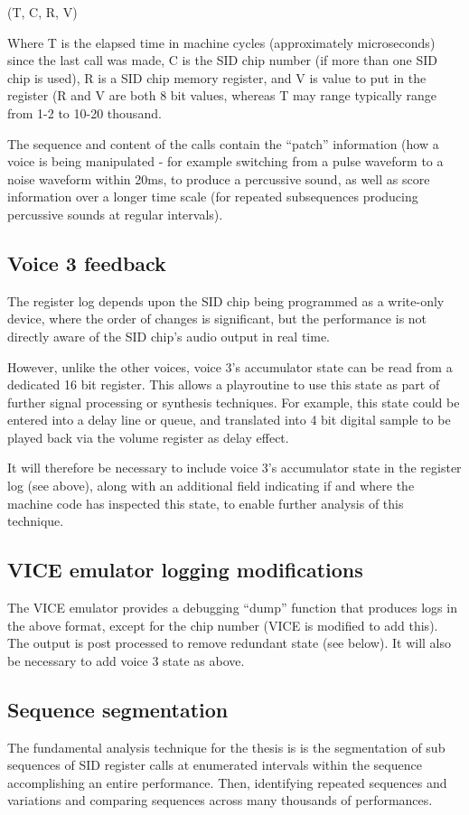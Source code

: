 \documentclass[10pt]{article}
\begin{document}
\begin{multicols*}{2}
  (T, C, R, V)

  Where T is the elapsed time in machine cycles (approximately
  microseconds) since the last call was made, C is the SID chip number
  (if more than one SID chip is used), R is a SID chip memory
  register, and V is value to put in the register (R and V are both 8
  bit values, whereas T may range typically range from 1-2 to 10-20
  thousand.

  The sequence and content of the calls contain the ``patch''
  information (how a voice is being manipulated - for example
  switching from a pulse waveform to a noise waveform within 20ms, to
  produce a percussive sound, as well as score information over a
  longer time scale (for repeated subsequences producing percussive
  sounds at regular intervals).

  \subsection{Voice 3 feedback}
  The register log depends upon the SID chip being programmed as a
  write-only device, where the order of changes is significant, but
  the performance is not directly aware of the SID chip's audio output
  in real time.

  However, unlike the other voices, voice 3's accumulator state can be
  read from a dedicated 16 bit register. This allows a playroutine to use
  this state as part of further signal processing or synthesis
  techniques. For example, this state could be entered into a delay
  line or queue, and translated into 4 bit digital sample to be played
  back via the volume register as delay effect.

  It will therefore be necessary to include voice 3's accumulator
  state in the register log (see above), along with an additional
  field indicating if and where the machine code has inspected this
  state, to enable further analysis of this technique.

  \subsection{VICE emulator logging modifications}
  The VICE emulator provides a debugging ``dump'' function that
  produces logs in the above format, except for the chip number
  (VICE is modified to add this).  The output is post processed
  to remove redundant state (see below).  It will also be
  necessary to add voice 3 state as above.

  \subsection{Sequence segmentation}
  The fundamental analysis technique for the thesis is
  is the segmentation of sub sequences of SID register calls at
  enumerated intervals within the sequence accomplishing an entire
  performance. Then, identifying repeated sequences and variations and
  comparing sequences across many thousands of performances.


\end{multicols*}
\end{document}
